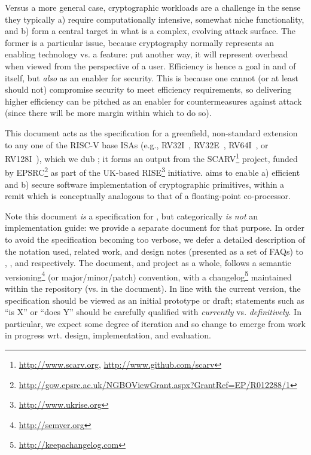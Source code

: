 
Versus a more general case, cryptographic workloads are a challenge in the
sense they typically
a) require computationally intensive, somewhat niche functionality,
   and
b) form a central target in what is a complex, evolving attack surface.
The former is a particular issue, because cryptography normally represents
an enabling technology vs. a feature: put another way, it will represent
overhead when viewed from the perspective of a user.  Efficiency is hence 
a goal in and of itself, but {\em also} as an enabler for security.  This 
is because one cannot (or at least should not) compromise security to meet 
efficiency requirements, so delivering higher efficiency can be pitched as 
an enabler for countermeasures against attack (since there will be more 
margin within which to do so).

This document acts as the specification for a 
greenfield, non-standard extension~\cite[Section 21.1]{SCARV:RV:ISA:I:17} 
to any one of the RISC-V base ISAs
(e.g., RV32I~\cite[Section 2]{SCARV:RV:ISA:I:17}, RV32E~\cite[Section 3]{SCARV:RV:ISA:I:17}, RV64I~\cite[Section 4]{SCARV:RV:ISA:I:17}, or RV128I~\cite[Section 5]{SCARV:RV:ISA:I:17}),
which we dub \XCID; it forms an output from the SCARV\footnote{
\url{http://www.scarv.org}, \url{http://www.github.com/scarv}
} project, funded by EPSRC\footnote{
\url{http://gow.epsrc.ac.uk/NGBOViewGrant.aspx?GrantRef=EP/R012288/1}
} as part of the UK-based RISE\footnote{
\url{http://www.ukrise.org}
} initiative.  
\XCID aims to enable
a) efficient
   and
b) secure
software implementation of cryptographic primitives, within a remit which
is conceptually analogous to that of a floating-point co-processor.

Note this document {\em is} a specification for \XCID, but categorically
{\em is not} an implementation guide: we provide a separate document for 
that purpose.  In order to avoid the specification becoming too verbose,
we defer a detailed description of the notation used, related work, and 
design notes (presented as a set of FAQs) to
,
,
and
respectively.  The document, and project as a whole, follows a semantic 
versioning\footnote{
\url{http://semver.org}
} (or major/minor/patch) convention, with a changelog\footnote{
\url{http://keepachangelog.com}
} maintained within the repository (vs. in the document).
In line with the current version, the specification should be viewed as an
initial prototype or draft; statements such as 
``\XCID is   X'' 
or
``\XCID does Y''
should be carefully qualified with {\em currently} vs. {\em definitively}.  
In particular, we expect some degree of iteration and so change to emerge 
from work in progress wrt. design, implementation, and evaluation.

